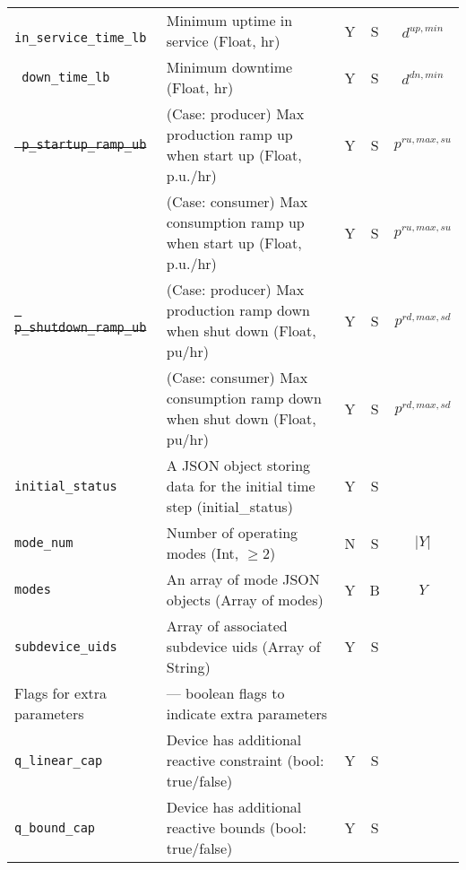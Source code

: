 \documentclass{article}
\begin{document}
\begin{center}
\begin{tabular}{ l | l | c | c | c |}
  {\tt\color{blue} in\_service\_time\_lb} & Minimum uptime in service (Float, hr) & Y & S & $d^{up,min}$\\
  {\tt\color{blue} down\_time\_lb} & Minimum downtime (Float, hr) & Y & S & $d^{dn,min}$\\
  \sout{\tt\color{blue} p\_startup\_ramp\_ub} & {(Case: producer) Max production ramp up when start up (Float, p.u./hr)} & Y & S & $p^{ru,max,su}$\\
                 & {(Case: consumer) Max consumption ramp up when start up (Float, p.u./hr)} & Y & S & $p^{ru,max,su}$\\
  \sout{\tt\color{blue} p\_shutdown\_ramp\_ub}& {(Case: producer) Max production ramp down when shut down (Float, pu/hr)} & Y & S & $p^{rd,max,sd}$\\
                 & {(Case: consumer) Max consumption ramp down when shut down (Float, pu/hr)} & Y & S & $p^{rd,max,sd}$\\


  {\tt initial\_status} & A JSON object storing data for the initial time step (initial\_status) & Y & S &  \\
  {\tt mode\_num} & Number of operating modes (Int, $\geq 2$) & N & S & $\lvert Y \rvert$ \\
{\tt modes} & An array of mode JSON objects (Array of modes) & Y & B & $Y$ \\
  {\tt subdevice\_uids} & Array of associated subdevice uids (Array of String) & Y & S & \\
  \hline
  Flags for extra parameters &  --- boolean flags to indicate extra parameters  &  &  & \\
  \hline
  {\tt q\_linear\_cap}      & Device has additional reactive constraint (bool: true/false) & Y & S & \\
  {\tt q\_bound\_cap}       & Device has additional reactive bounds (bool: true/false) & Y & S & \\
  \hline
  \end{tabular}
\end{center}
\end{document}
